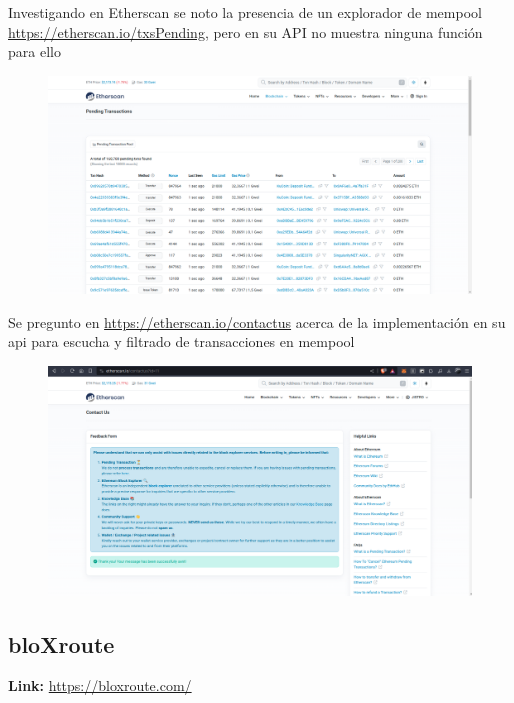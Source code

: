 \medskip

Investigando en Etherscan se noto la presencia de un explorador de mempool \url{https://etherscan.io/txsPending}, pero en su API no muestra ninguna función para ello

\begin{figure}
    \centering
    \includegraphics[width=1\linewidth]{brave_screenshot_etherscan.io.png}
\end{figure}

Se pregunto en \url{https://etherscan.io/contactus} acerca de la implementación en su api para escucha y filtrado de transacciones en mempool

\begin{figure}
    \centering
    \includegraphics[width=1\linewidth]{img//screenshots/Screenshot from 2023-12-18 00-42-27.png}
\end{figure}
\clearpage
\subsection{bloXroute}

\textbf{Link:} \url{https://bloxroute.com/}

